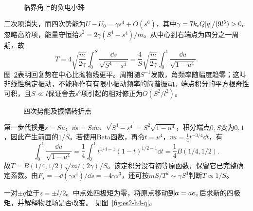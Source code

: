 \begin{figure}[H]\centering
{}
\caption{临界角上的负电小珠}\label{fig:es2-h3-q}
\end{figure}
\begin{solution}
二次项消失，而四次势能为$U-U_0=\gamma s^4+O(s^6)$，其中$\gamma=7k_{\rm e} Q|q|/(9l^5)>0$。忽略高阶项，能量守恒给$\dot s^2=2\gamma(S^4-s^4)/m$。从中心到右端点为四分之一周期，故
\[T=4\sqrt{\frac m{2\gamma}}\int_0^S\frac{\dd s}{\sqrt{S^4-s^4}}
=\frac4S\sqrt{\frac m{2\gamma}}\int_0^1\frac{\dd u}{\sqrt{1-u^4}}.\]
图~\ref{fig:es2-h3-s}表明回复势在中心比抛物线更平。周期随$S^{-1}$发散，角频率随幅度趋零；这叫非线性稳定振动，不能称作有有限小振动频率的简谐振动。端点积分的平方根奇性可积，且$S\ll l$保证舍去$s^6$项引起的相对修正为$O(S^2/l^2)$。
\begin{figure}[H]\centering
{}
\caption{四次势能及振幅转折点}\label{fig:es2-h3-s}
\end{figure}


第一步代换是$s=Su$，$\dd s=S\dd u$、$\sqrt{S^4-s^4}=S^2\sqrt{1-u^4}$，积分端点$0,S$变为$0,1$，因此产生前面的$1/S$。若使用Beta函数，再令$t=u^4$，$\dd u=\tfrac14t^{-3/4}\dd t$，有
\[\int_0^1\frac{\dd u}{\sqrt{1-u^4}}
=\frac14\int_0^1t^{1/4-1}(1-t)^{1/2-1}\dd t
=\frac14B(1/4,1/2).\]
故$T=B(1/4,1/2)\sqrt{m/(2\gamma)}/S$。该定积分没有初等原函数，保留它已完整确定系数。由$F_s=-\dd(\gamma s^4)/\dd s=-4\gamma s^3$，还可按$mS/T^2\sim\gamma S^3$判断$T\propto1/S$。
\end{solution}

\begin{exercise}[平移对中性偶极四极矩的影响]\label{ex:es2-h4}
一对$\pm q$位于$z=\pm l/2$。中点处四极矩为零，将原点移动到$\bm{a}=a\bm{e}_z$后求新的四极矩，并解释物理场是否改变。 见图~\ref{fig:es2-h4-q}。
\end{exercise}

